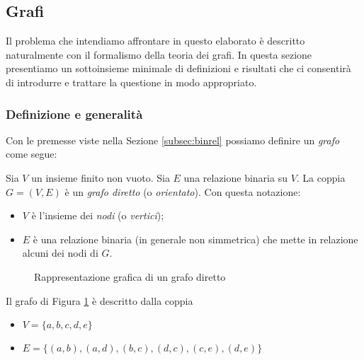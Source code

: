 \subsection{Grafi}
Il problema che intendiamo affrontare in questo elaborato è descritto naturalmente con il formalismo della teoria dei grafi. In questa sezione presentiamo un sottoinsieme minimale di definizioni e risultati che ci consentirà di introdurre e trattare la questione in modo appropriato.

\subsubsection{Definizione e generalità}
Con le premesse viste nella Sezione \ref{subsec:binrel} possiamo definire un \emph{grafo} come segue:
\begin{definition}
    Sia $V$ un insieme finito non vuoto. Sia $E$ una relazione binaria su $V$. La coppia $G = (V, E)$ è un \emph{grafo diretto} (o \emph{orientato}). Con questa notazione:
    \begin{itemize}
        \item $V$ è l'insieme dei \emph{nodi} (o \emph{vertici});
        \item $E$ è una relazione binaria (in generale non simmetrica) che mette in relazione alcuni dei nodi di $G$.
    \end{itemize}
\end{definition}

\begin{example}
    \begin{figure}[t]
        \centering
        \caption{Rappresentazione grafica di un grafo diretto}
        \label{fig:graph}
    \end{figure}
    Il grafo di Figura \ref{fig:graph} è descritto dalla coppia
    \begin{itemize}
        \item $V = \{a,b,c,d,e\}$
        \item $E = \{(a,b), (a,d), (b,c), (d,c), (c,e), (d,e)\}$
    \end{itemize}
\end{example}

